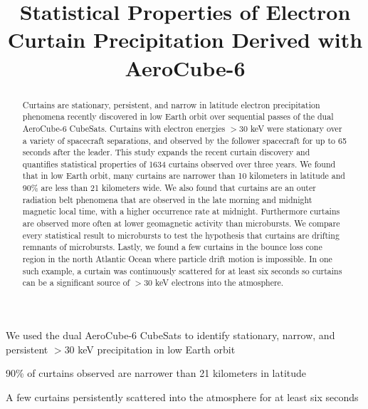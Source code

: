 \documentclass[draft]{agujournal2019}
\begin{document}
\title{Statistical Properties of Electron Curtain Precipitation Derived with AeroCube-6}

%
%






\begin{keypoints}
\item We used the dual AeroCube-6 CubeSats to identify stationary, narrow, and persistent $>30$ keV precipitation in low Earth orbit
\item 90\% of curtains observed are narrower than 21 kilometers in latitude
\item A few curtains persistently scattered into the atmosphere for at least six seconds
\end{keypoints}


\begin{abstract}
Curtains are stationary, persistent, and narrow in latitude electron precipitation phenomena recently discovered in low Earth orbit over sequential passes of the dual AeroCube-6 CubeSats. Curtains with electron energies $> 30$ keV were stationary over a variety of spacecraft separations, and observed by the follower spacecraft for up to 65 seconds after the leader. This study expands the recent curtain discovery and quantifies statistical properties of 1634 curtains observed over three years. We found that in low Earth orbit, many curtains are narrower than 10 kilometers in latitude and 90\% are less than 21 kilometers wide. We also found that curtains are an outer radiation belt phenomena that are observed in the late morning and midnight magnetic local time, with a higher occurrence rate at midnight. Furthermore curtains are observed more often at lower geomagnetic activity than microbursts.  We compare every statistical result to microbursts to test the hypothesis that curtains are drifting remnants of microbursts. Lastly, we found a few curtains in the bounce loss cone region in the north Atlantic Ocean where particle drift motion is impossible. In one such example, a curtain was continuously scattered for at least six seconds so curtains can be a significant source of $> 30$ keV electrons into the atmosphere.
\end{abstract}
\end{document}
